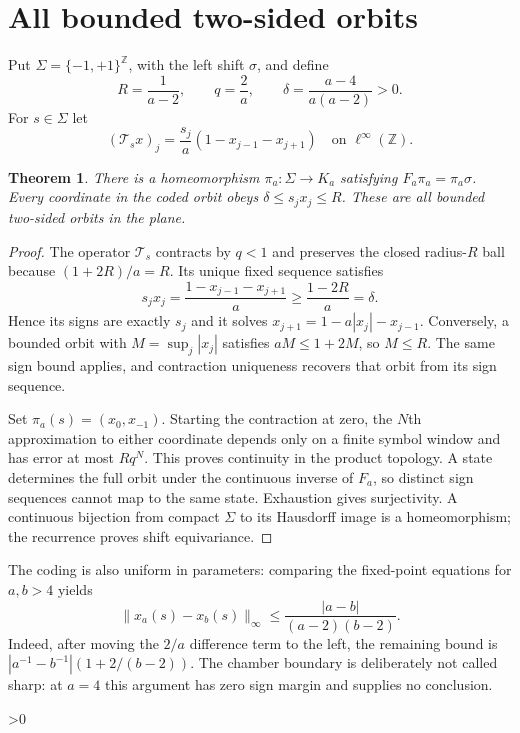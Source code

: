 \documentclass[10pt]{article}
\newtheorem{theorem}{Theorem}
\newcommand{\Z}{\mathbb Z}
\begin{document}
\section{All bounded two-sided orbits}
Put $\Sigma=\{-1,+1\}^{\Z}$, with the left shift $\sigma$, and define
\[
 R=\frac1{a-2},\qquad q=\frac2a,\qquad
 \delta=\frac{a-4}{a(a-2)}>0.
\]
For $s\in\Sigma$ let
\[
 (\mathcal T_s x)_j=\frac{s_j}{a}(1-x_{j-1}-x_{j+1})
 \quad\text{on }\ell^\infty(\Z).
\]
\begin{theorem}\label{coding}
There is a homeomorphism $\pi_a:\Sigma\to K_a$ satisfying
$F_a\pi_a=\pi_a\sigma$. Every coordinate in the coded orbit obeys
$\delta\le s_jx_j\le R$. These are all bounded two-sided orbits in the plane.
\end{theorem}
\begin{proof}
The operator $\mathcal T_s$ contracts by $q<1$ and preserves the closed
radius-$R$ ball because $(1+2R)/a=R$. Its unique fixed sequence satisfies
\[
 s_jx_j=\frac{1-x_{j-1}-x_{j+1}}a\ge\frac{1-2R}a=\delta.
\]
Hence its signs are exactly $s_j$ and it solves
$x_{j+1}=1-a|x_j|-x_{j-1}$. Conversely, a bounded orbit with
$M=\sup_j|x_j|$ satisfies $aM\le1+2M$, so $M\le R$.
The same sign bound applies, and contraction uniqueness recovers that
orbit from its sign sequence.

Set $\pi_a(s)=(x_0,x_{-1})$. Starting the contraction at zero, the $N$th
approximation to either coordinate depends only on a finite symbol window
and has error at most $Rq^N$. This proves continuity in the product topology.
A state determines the full orbit under the continuous inverse of $F_a$,
so distinct sign sequences cannot map to the same state. Exhaustion gives
surjectivity. A continuous bijection from compact $\Sigma$ to its Hausdorff
image is a homeomorphism; the recurrence proves shift equivariance.
\end{proof}
The coding is also uniform in parameters: comparing the fixed-point
equations for $a,b>4$ yields
\begin{equation}\label{parameter}
 \|x_a(s)-x_b(s)\|_\infty
 \le \frac{|a-b|}{(a-2)(b-2)}.
\end{equation}
Indeed, after moving the $2/a$ difference term to the left, the remaining
bound is $|a^{-1}-b^{-1}|(1+2/(b-2))$.
The chamber boundary is deliberately not called sharp: at $a=4$ this
argument has zero sign margin and supplies no conclusion.

\ifnum\CRevisionRound>0
\end{document}

